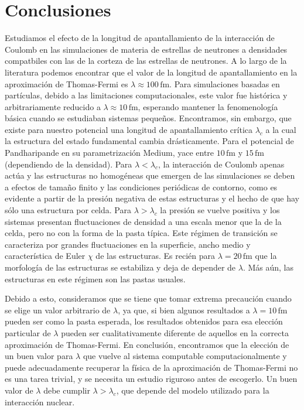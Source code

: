 \section{Conclusiones}\label{concluding}

Estudiamos el efecto de la longitud de apantallamiento de la interacción de Coulomb en las simulaciones de materia de estrellas de neutrones a densidades compatbiles con las de la corteza de las estrellas de neutrones.
A lo largo de la literatura podemos encontrar que el valor de la longitud de apantallamiento en la aproximación de Thomas-Fermi es $\lambda\approx100\,\text{fm}$.
Para simulaciones basadas en partículas, debido a las limitaciones computacionales, este valor fue histórica y arbitrariamente reducido a $\lambda\approx10\,\text{fm}$, esperando mantener la fenomenología básica cuando se estudiaban sistemas pequeños.
Encontramos, sin embargo, que existe para nuestro potencial una longitud de apantallamiento crítica $\lambda_c$ a la cual la estructura del estado fundamental cambia drásticamente.
Para el potencial de Pandharipande en su parametrización Medium, yace entre $10\,\text{fm}$ y $15\,\text{fm}$ (dependiendo de la densidad).
Para $\lambda<\lambda_c$, la interacción de Coulomb apenas actúa y las estructuras no homogéneas que emergen de las simulaciones se deben a efectos de tamaño finito y las condiciones periódicas de contorno, como es evidente a partir de la presión negativa de estas estructuras y el hecho de que hay sólo una estructura por celda.
Para $\lambda>\lambda_c$ la presión se vuelve positiva y los sistemas presentan fluctuaciones de densidad a una escala menor que la de la celda, pero no con la forma de la pasta típica.
Este régimen de transición se caracteriza por grandes fluctuaciones en la superficie, ancho medio y característica de Euler $\chi$ de las estructuras.
Es recién para $\lambda=20\,\text{fm}$ que la morfología de las estructuras se estabiliza y deja de depender de $\lambda$.
Más aún, las estructuras en este régimen son las pastas usuales.

Debido a esto, consideramos que se tiene que tomar extrema precaución cuando se elige un valor arbitrario de $\lambda$, ya que, si bien algunos resultados a $\lambda=10\,\text{fm}$ pueden ser como la pasta esperada, los resultados obtenidos para esa elección particular de $\lambda$ pueden ser cualitativamente diferente de aquellos en la correcta aproximación de Thomas-Fermi.
En conclusión, encontramos que la elección de un buen valor para $\lambda$ que vuelve al sistema computable computacionalmente y puede adecuadamente recuperar la física de la aproximación de Thomas-Fermi no es una tarea trivial, y se necesita un estudio riguroso antes de escogerlo.
Un buen valor de $\lambda$ debe cumplir $\lambda>\lambda_c$, que depende del modelo utilizado para la interacción nuclear.


